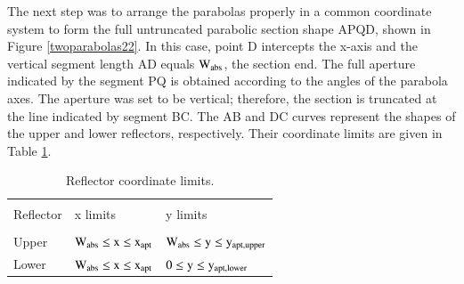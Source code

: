 \newpage
The next step was to arrange the parabolas properly in a common coordinate system to form the full untruncated parabolic section shape APQD, shown in Figure \ref{twoparabolas22}. In this case, point D intercepts the x-axis and the vertical segment length AD equals $\rm{W_{abs}}$, the section end. The full aperture indicated by the segment PQ is obtained according to the angles of the parabola axes. The aperture was set to be vertical; therefore, the section is truncated at the line indicated by segment BC. The AB and DC curves represent the shapes of the upper and lower reflectors, respectively. Their coordinate limits are given in Table \ref{coordinates}.


\begin{table}[!ht]
	\centering
	\caption{Reflector coordinate limits.}
	\begin{tabular}{lll}
		\hline \\[-12pt]
		\vspace*{0.1cm} Reflector & x limits & y limits \\ [0pt]
		\hline \\[-12pt]
		Upper & $\rm{{W_{abs}} \le {x} \le {x_{apt}}}$ & $\rm{{W_{abs}} \le {y} \le {y_{apt,upper}}}$ \\ [5pt]
		Lower & $\rm{{W_{abs}} \le {x} \le {x_{apt}}}$ & $\rm{0 \le {y} \le {y_{apt,lower}}}$ \\ 
		\hline 
	\end{tabular}
	\label{coordinates}
\end{table}

